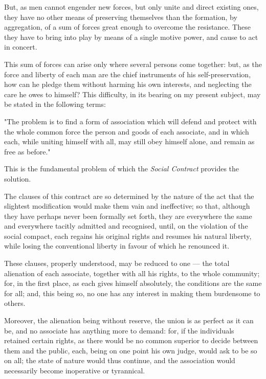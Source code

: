 \documentclass[12pt]{report}
\begin{document}
But, as men cannot engender new forces, but only unite and direct existing ones, they have no other means of preserving themselves than the formation, by aggregation, of a sum of forces great enough to overcome the resistance. These they have to bring into play by means of a single motive power, and cause to act in concert.

This sum of forces can arise only where several persons come together: but, as the force and liberty of each man are the chief instruments of his self-preservation, how can he pledge them without harming his own interests, and neglecting the care he owes to himself? This difficulty, in its bearing on my present subject, may be stated in the following terms:\begin{displayquote}
"The problem is to find a form of association which will defend and protect with the whole common force the person and goods of each associate, and in which each, while uniting himself with all, may still obey himself alone, and remain as free as before."
\end{displayquote} This is the fundamental problem of which the \textit{Social Contract} provides the solution.

The clauses of this contract are so determined by the nature of the act that the slightest modification would make them vain and ineffective; so that, although they have perhaps never been formally set forth, they are everywhere the same and everywhere tacitly admitted and recognised, until, on the violation of the social compact, each regains his original rights and resumes his natural liberty, while losing the conventional liberty in favour of which he renounced it.

These clauses, properly understood, may be reduced to one — the total alienation of each associate, together with all his rights, to the whole community; for, in the first place, as each gives himself absolutely, the conditions are the same for all; and, this being so, no one has any interest in making them burdensome to others.

Moreover, the alienation being without reserve, the union is as perfect as it can be, and no associate has anything more to demand: for, if the individuals retained certain rights, as there would be no common superior to decide between them and the public, each, being on one point his own judge, would ask to be so on all; the state of nature would thus continue, and the association would necessarily become inoperative or tyrannical.
\end{document}
